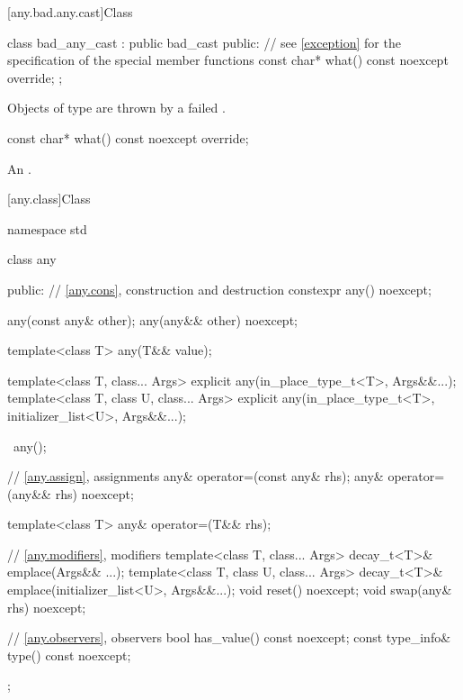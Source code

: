 [any.bad.any.cast]{Class }

%
\begin{codeblock}
class bad_any_cast : public bad_cast {
public:
  // see \ref{exception} for the specification of the special member functions
  const char* what() const noexcept override;
};
\end{codeblock}

\pnum
Objects of type  are thrown by a failed .

%
\begin{itemdecl}
const char* what() const noexcept override;
\end{itemdecl}

\begin{itemdescr}
\pnum
\returns
An  \ntbs{}.
\end{itemdescr}

[any.class]{Class }

\begin{codeblock}
namespace std {
  class any {
  public:
    // \ref{any.cons}, construction and destruction
    constexpr any() noexcept;

    any(const any& other);
    any(any&& other) noexcept;

    template<class T>
      any(T&& value);

    template<class T, class... Args>
      explicit any(in_place_type_t<T>, Args&&...);
    template<class T, class U, class... Args>
      explicit any(in_place_type_t<T>, initializer_list<U>, Args&&...);

    ~any();

    // \ref{any.assign}, assignments
    any& operator=(const any& rhs);
    any& operator=(any&& rhs) noexcept;

    template<class T>
      any& operator=(T&& rhs);

    // \ref{any.modifiers}, modifiers
    template<class T, class... Args>
      decay_t<T>& emplace(Args&& ...);
    template<class T, class U, class... Args>
      decay_t<T>& emplace(initializer_list<U>, Args&&...);
    void reset() noexcept;
    void swap(any& rhs) noexcept;

    // \ref{any.observers}, observers
    bool has_value() const noexcept;
    const type_info& type() const noexcept;
  };
}
\end{codeblock}


